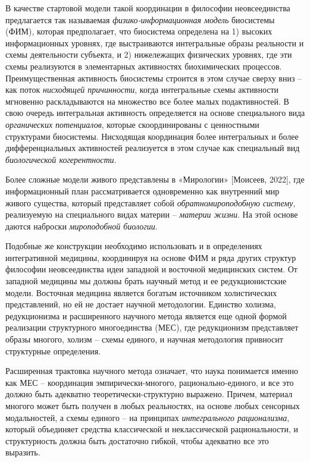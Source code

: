     В качестве стартовой модели такой координации в философии неовсеединства предлагается так называемая \textit{физико-информационная модель} биосистемы (ФИМ), которая предполагает, что биосистема определена на 1) высоких информационных уровнях, где выстраиваются интегральные образы реальности и схемы деятельности субъекта, и 2) нижележащих физических уровнях, где эти схемы реализуются в элементарных активностях биохимических процессов. Преимущественная активность биосистемы строится в этом случае сверху вниз – как поток \textit{нисходящей причинности}, когда интегральные схемы активности мгновенно раскладываются на множество все более малых подактивностей. В свою очередь интегральная активность определяется на основе специального вида \textit{органических потенциалов}, которые скоординированы с ценностными структурами биосистемы. Нисходящая координация более интегральных и более дифференциальных активностей реализуется в этом случае как специальный вид \textit{биологической когерентности}.

    Более сложные модели живого представлены в «Мирологии» [Моисеев, 2022], где информационный план рассматривается одновременно как внутренний мир живого существа, который представляет собой \textit{обратномироподобную систему}, реализуемую на специального видах материи – \textit{материи жизни}. На этой основе даются наброски \textit{мироподобной биологии}.

    Подобные же конструкции необходимо использовать и в определениях интегративной медицины, координируя на основе ФИМ и ряда других структур философии неовсеединства идеи западной и восточной медицинских систем. От западной медицины мы должны брать научный метод и ее редукционистские модели. Восточная медицина является богатым источником холистических представлений, но ей не достает научной методологии. Единство холизма, редукционизма и расширенного научного метода является еще одной формой реализации структурного многоединства (МЕС), где редукционизм представляет образы многого, холизм – схемы единого, и научная методология привносит структурные определения.

    Расширенная трактовка научного метода означает, что наука понимается именно как МЕС – координация эмпирически-многого, рационально-единого, и все это должно быть адекватно теоретически-структурно выражено. Причем, материал многого может быть получен в любых реальностях, на основе любых сенсорных модальностей, а схемы единого – на принципах \textit{интегрального рационализма}, который объединяет средства классической и неклассической рациональности, и структурность должна быть достаточно гибкой, чтобы адекватно все это выразить.

